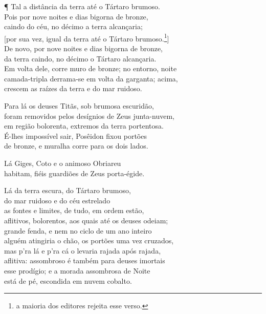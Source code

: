 ¶ Tal a distância da terra até o Tártaro brumoso.\\
Pois por nove noites e dias bigorna de bronze,\\
caindo do céu, no décimo a terra alcançaria;\\
{[}por sua vez, igual da terra até o Tártaro brumoso.\footnote{a maioria dos editores rejeita esse verso.}{]}\\  
De novo, por nove noites e dias bigorna de bronze,\\
da terra caindo, no décimo o Tártaro alcançaria. \\
Em volta dele, corre muro de bronze; no entorno, noite\\
camada-tripla derrama-se em volta da garganta; acima,\\
crescem as raízes da terra e do mar ruidoso.

\quad{}Para lá os deuses Titãs, sob brumosa escuridão,\\
foram removidos pelos desígnios de Zeus junta-nuvem, \\
em região bolorenta, extremos da terra portentosa.\\
É-lhes impossível sair, Posêidon fixou portões\\
de bronze, e muralha corre para os dois lados.

\quad{}Lá Giges, Coto e o animoso Obriareu\\
habitam, fiéis guardiões de Zeus porta-égide. 

\quad{}Lá da terra escura, do Tártaro brumoso,\\
do mar ruidoso e do céu estrelado\\
as fontes e limites, de tudo, em ordem estão,\\
aflitivos, bolorentos, aos quais até os deuses odeiam;\\
grande fenda, e nem no ciclo de um ano inteiro \\
alguém atingiria o chão, os portões uma vez cruzados,\\
mas p'ra lá e p'ra cá o levaria rajada após rajada,\\
aflitiva: assombroso é também para deuses imortais\\
esse prodígio; e a morada assombrosa de Noite\\
está de pé, escondida em nuvem cobalto. 

